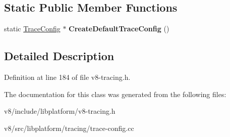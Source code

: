 \subsection*{Static Public Member Functions}
\begin{DoxyCompactItemize}
\item 
\mbox{\label{classv8_1_1platform_1_1tracing_1_1TraceConfig_a66b99c8db80e4834a682ccc95b139b2c}} 
static \mbox{\hyperlink{classv8_1_1platform_1_1tracing_1_1TraceConfig}{Trace\+Config}} $\ast$ {\bfseries Create\+Default\+Trace\+Config} ()
\end{DoxyCompactItemize}


\subsection{Detailed Description}


Definition at line 184 of file v8-\/tracing.\+h.



The documentation for this class was generated from the following files\+:\begin{DoxyCompactItemize}
\item 
v8/include/libplatform/v8-\/tracing.\+h\item 
v8/src/libplatform/tracing/trace-\/config.\+cc\end{DoxyCompactItemize}
